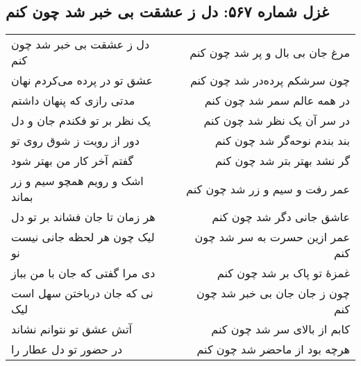 \begin{center}
\section*{غزل شماره ۵۶۷: دل ز عشقت بی خبر شد چون کنم}
\label{sec:567}
\begin{longtable}{l p{0.5cm} r}
دل ز عشقت بی خبر شد چون کنم
&&
مرغ جان بی بال و پر شد چون کنم
\\
عشق تو در پرده می‌کردم نهان
&&
چون سرشکم پرده‌در شد چون کنم
\\
مدتی رازی که پنهان داشتم
&&
در همه عالم سمر شد چون کنم
\\
یک نظر بر تو فکندم جان و دل
&&
در سر آن یک نظر شد چون کنم
\\
دور از رویت ز شوق روی تو
&&
بند بندم نوحه‌گر شد چون کنم
\\
گفتم آخر کار من بهتر شود
&&
گر نشد بهتر بتر شد چون کنم
\\
اشک و رویم همچو سیم و زر بماند
&&
عمر رفت و سیم و زر شد چون کنم
\\
هر زمان تا جان فشاند بر تو دل
&&
عاشق جانی دگر شد چون کنم
\\
لیک چون هر لحظه جانی نیست نو
&&
عمر ازین حسرت به سر شد چون کنم
\\
دی مرا گفتی که جان با من بباز
&&
غمزهٔ تو پاک بر شد چون کنم
\\
نی که جان درباختن سهل است لیک
&&
چون ز جان جان بی خبر شد چون کنم
\\
آتش عشق تو نتوانم نشاند
&&
کابم از بالای سر شد چون کنم
\\
در حضور تو دل عطار را
&&
هرچه بود از ماحضر شد چون کنم
\\
\end{longtable}
\end{center}
